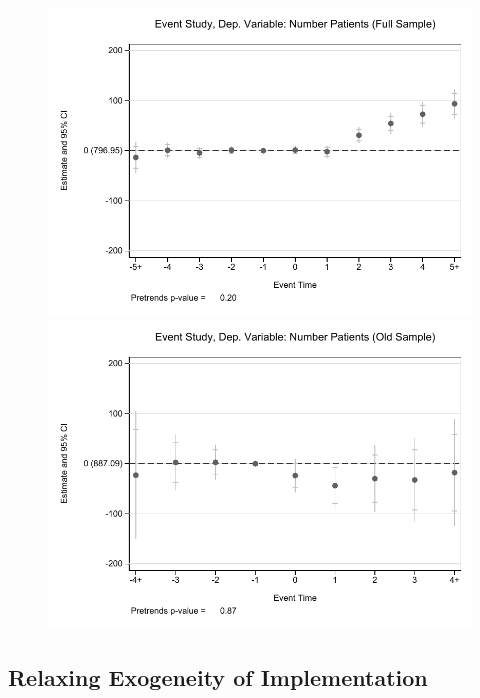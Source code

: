 \documentclass[11pt]{article}
\begin{document}
\begin{figure}[ht]
\caption{}
        \begin{minipage}[b]{0.47\linewidth}
            \centering
            \includegraphics[width=\textwidth]{Objects/prod_eventstudy_fullsample.pdf}
        \end{minipage}
        \hspace{0.2cm}
        \begin{minipage}[b]{0.47\linewidth}
            \centering
            \includegraphics[width=\textwidth]{Objects/prod_eventstudy_oldsample.pdf}
        \end{minipage}
\end{figure}

\subsection{Relaxing Exogeneity of Implementation}
\end{document}
